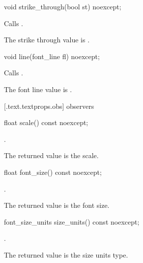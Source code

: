 %
\begin{itemdecl}
void strike_through(bool st) noexcept;
\end{itemdecl}
\begin{itemdescr}
\pnum
\effects Calls .

\pnum
\remarks The strike through value is .
\end{itemdescr}

%
\begin{itemdecl}
void line(font_line fl) noexcept;
\end{itemdecl}
\begin{itemdescr}
\pnum
\effects Calls .

\pnum
\remarks The font line value is .
\end{itemdescr}

 [\iotwod.text.textprops.obs] { observers}

%
\begin{itemdecl}
float scale() const noexcept;
\end{itemdecl}
\begin{itemdescr}
\pnum
\returns {}.

\pnum
\remarks
The returned value is the scale.
\end{itemdescr}

%
\begin{itemdecl}
float font_size() const noexcept;
\end{itemdecl}
\begin{itemdescr}
\pnum
\returns {}.

\pnum
\remarks
The returned value is the font size.
\end{itemdescr}

%
\begin{itemdecl}
font_size_units size_units() const noexcept;
\end{itemdecl}
\begin{itemdescr}
\pnum
\returns {}.

\pnum
\remarks
The returned value is the size units type.
\end{itemdescr}

